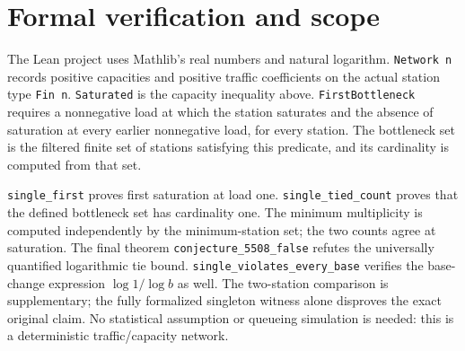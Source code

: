 \documentclass[10pt]{article}
\begin{document}
\section*{Formal verification and scope}
The Lean project uses Mathlib's real numbers and natural logarithm.
\texttt{Network n} records positive capacities and positive traffic
coefficients on the actual station type \texttt{Fin n}.
\texttt{Saturated} is the capacity inequality above.
\texttt{FirstBottleneck} requires a nonnegative load at which the station
saturates and the absence of saturation at every earlier nonnegative load,
for every station. The bottleneck set is the filtered finite set of stations
satisfying this predicate, and its cardinality is computed from that set.

\texttt{single\_first} proves first saturation at load one.
\texttt{single\_tied\_count} proves that the defined bottleneck set has
cardinality one. The minimum multiplicity is computed independently by
the minimum-station set; the two counts agree at saturation.
The final theorem
\texttt{conjecture\_5508\_false} refutes the universally quantified
logarithmic tie bound.
\texttt{single\_violates\_every\_base} verifies the base-change expression
$\log1/\log b$ as well.
The two-station comparison is supplementary; the fully formalized singleton
witness alone disproves the exact original claim.
No statistical assumption or queueing simulation is needed: this is a
deterministic traffic/capacity network.
\end{document}
